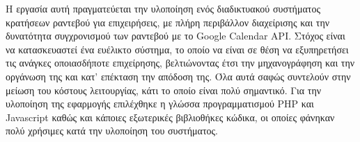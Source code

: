 
\Titlepage
\Declarationpage

\begin{Abstract}
Η εργασία αυτή πραγματεύεται την υλοποίηση ενός διαδικτυακού συστήματος κρατήσεων ραντεβού για επιχειρήσεις, με πλήρη περιβάλλον διαχείρισης και την δυνατότητα συγχρονισμού των ραντεβού με το Google Calendar API. Στόχος είναι να κατασκευαστεί ένα ευέλικτο σύστημα, το οποίο να είναι σε θέση να εξυπηρετήσει τις ανάγκες οποιασδήποτε επιχείρησης, βελτιώνοντας έτσι την μηχανογράφηση και την οργάνωση της και κατ' επέκταση την απόδοση της. Όλα αυτά σαφώς συντελούν στην μείωση του κόστους λειτουργίας, κάτι το οποίο είναι πολύ σημαντικό. Για την υλοποίηση της εφαρμογής επιλέχθηκε η γλώσσα προγραμματισμού PHP και Javascript καθώς και κάποιες εξωτερικές βιβλιοθήκες κώδικα, οι οποίες φάνηκαν πολύ χρήσιμες κατά την υλοποίηση του συστήματος.
\end{Abstract}

\tableofcontents

